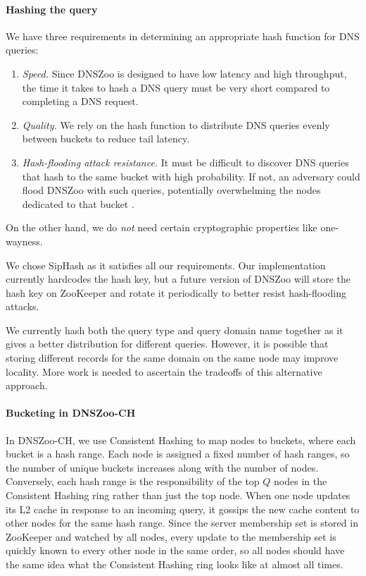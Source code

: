 \documentclass[format=sigconf,nonacm,screen]{acmart}
\newcommand{\dnszoo}{\textsf{DNSZoo}}
\newcommand{\dnszooch}{\textsf{DNSZoo-CH}}
\begin{document}
\paragraph{\textbf{Hashing the query}}
We have three requirements in determining an appropriate hash function for DNS queries:
\begin{enumerate}
    \item \emph{Speed.} Since \dnszoo{} is designed to have low latency and high throughput, the time it takes to hash a DNS query must be very short compared to completing a DNS request.
    \item \emph{Quality.} We rely on the hash function to distribute DNS queries evenly between buckets to reduce tail latency.
    \item \emph{Hash-flooding attack resistance.} It must be difficult to discover DNS queries that hash to the same bucket with high probability. If not, an adversary could flood \dnszoo{} with such queries, potentially overwhelming the nodes dedicated to that bucket \cite{2011hashdos}.
\end{enumerate}
On the other hand, we do \emph{not} need certain cryptographic properties like one-wayness.

We chose SipHash \cite{2012siphash} as it satisfies all our requirements. Our implementation currently hardcodes the hash key, but a future version of \dnszoo{} will store the hash key on ZooKeeper and rotate it periodically to better resist hash-flooding attacks.

We currently hash both the query type and query domain name together as it gives a better distribution for different queries. However, it is possible that storing different records for the same domain on the same node may improve locality. More work is needed to ascertain the tradeoffs of this alternative approach.

\paragraph{\textbf{Bucketing in \dnszooch{}}}
In \dnszooch{}, we use Consistent Hashing to map nodes to buckets, where each bucket is a hash range. Each node is assigned a fixed number of hash ranges, so the number of unique buckets increases along with the number of nodes. Conversely, each hash range is the responsibility of the top $Q$ nodes in the Consistent Hashing ring rather than just the top node. When one node updates its L2 cache in response to an incoming query, it gossips the new cache content to other nodes for the same hash range. Since the server membership set is stored in ZooKeeper and watched by all nodes, every update to the membership set is quickly known to every other node in the same order, so all nodes should have the same idea what the Consistent Hashing ring looks like at almost all times.
\end{document}
